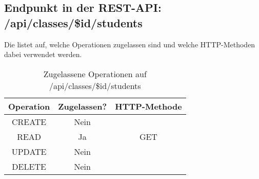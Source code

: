 \subsection{Endpunkt in der REST-API: /api/classes/\$id/students}
Die  listet auf, welche Operationen zugelassen sind und welche HTTP-Methoden dabei verwendet werden. 

\begin{table}[!htbp]
	\begin{tabular}{|c|c|c|}
		\hline
			\textbf{Operation} & \textbf{Zugelassen?} & \textbf{HTTP-Methode} \\ \hline
			CREATE & Nein & \\ \hline 
			READ & Ja & GET \\ \hline
			UPDATE & Nein & \\ \hline 
			DELETE & Nein & \\ \hline
	\end{tabular}

		\caption{Zugelassene Operationen auf /api/classes/\$id/students}
		\label{tab:rest:api:classes:id:students:meth}
\end{table}

